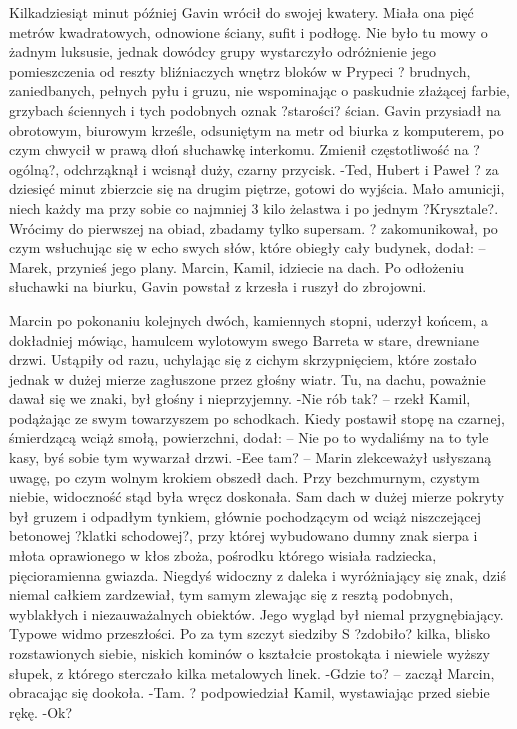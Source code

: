 \documentclass[../MAIN.tex]{subfiles}
\begin{document}
Kilkadziesiąt minut później Gavin wrócił do swojej kwatery. Miała ona pięć metrów kwadratowych, odnowione ściany, sufit i podłogę. Nie było tu mowy o żadnym luksusie, jednak dowódcy grupy wystarczyło odróżnienie jego pomieszczenia od reszty bliźniaczych wnętrz bloków w Prypeci ? brudnych, zaniedbanych, pełnych pyłu i gruzu, nie wspominając o paskudnie złażącej farbie, grzybach ściennych i tych podobnych oznak ?starości? ścian.
Gavin przysiadł na obrotowym, biurowym krześle, odsuniętym na metr od biurka z komputerem, po czym chwycił w prawą dłoń słuchawkę interkomu. Zmienił częstotliwość na ?ogólną?, odchrząknął i wcisnął duży, czarny przycisk.
-Ted, Hubert i Paweł ? za dziesięć minut zbierzcie się na drugim piętrze, gotowi do wyjścia. Mało amunicji, niech każdy ma przy sobie co najmniej 3 kilo żelastwa i po jednym ?Krysztale?. Wrócimy do pierwszej na obiad, zbadamy tylko supersam. ? zakomunikował, po czym wsłuchując się w echo swych słów, które obiegły cały budynek, dodał: -- Marek, przynieś jego plany. Marcin, Kamil, idziecie na dach.
Po odłożeniu słuchawki na biurku, Gavin powstał z krzesła i ruszył do zbrojowni.


Marcin po pokonaniu kolejnych dwóch, kamiennych stopni, uderzył końcem, a dokładniej mówiąc, hamulcem wylotowym swego Barreta w stare, drewniane drzwi. Ustąpiły od razu, uchylając się z cichym skrzypnięciem, które zostało jednak w dużej mierze zagłuszone przez głośny wiatr. Tu, na dachu, poważnie dawał się we znaki, był głośny i nieprzyjemny.
-Nie rób tak? -- rzekł Kamil, podążając ze swym towarzyszem po schodkach. Kiedy postawił stopę na czarnej, śmierdzącą wciąż smołą, powierzchni, dodał: -- Nie po to wydaliśmy na to tyle kasy, byś sobie tym wywarzał drzwi.
-Eee tam? -- Marin zlekceważył usłyszaną uwagę, po czym wolnym krokiem obszedł dach.
Przy bezchmurnym, czystym niebie, widoczność stąd była wręcz doskonała.
Sam dach w dużej mierze pokryty był gruzem i odpadłym tynkiem, głównie pochodzącym od wciąż niszczejącej betonowej ?klatki schodowej?, przy której wybudowano dumny znak sierpa i młota oprawionego w kłos zboża, pośrodku którego wisiała radziecka, pięcioramienna gwiazda.
Niegdyś widoczny z daleka i wyróżniający się znak, dziś niemal całkiem zardzewiał, tym samym zlewając się z resztą podobnych, wyblakłych i niezauważalnych obiektów. Jego wygląd był niemal przygnębiający. Typowe widmo przeszłości.
Po za tym szczyt siedziby S ?zdobiło? kilka, blisko rozstawionych siebie, niskich kominów o kształcie prostokąta i niewiele wyższy słupek, z którego sterczało kilka metalowych linek.
-Gdzie to? -- zaczął Marcin, obracając się dookoła.
-Tam. ? podpowiedział Kamil, wystawiając przed siebie rękę.
-Ok?
\end{document}
